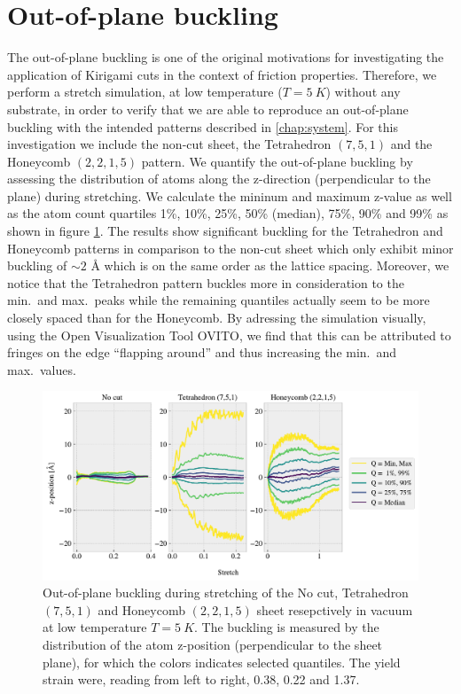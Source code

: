\section{Out-of-plane buckling}\label{sec:out-of-plane_buckling}
The out-of-plane buckling is one of the original motivations for investigating
the application of Kirigami cuts in the context of friction properties. Therefore, we perform a stretch simulation, at low temperature ($T = \SI{5}{K}$) without any substrate, in order to verify that we are able to reproduce an out-of-plane buckling with the
intended patterns described in \cref{chap:system}. For this investigation we include the non-cut sheet, the Tetrahedron $(7,5,1)$ and the Honeycomb $(2,2,1,5)$ pattern. We quantify the out-of-plane buckling by assessing the distribution of atoms along the z-direction (perpendicular to the plane) during stretching. We calculate the
mininum and maximum z-value as well as the atom count quartiles 1\%, 10\%, 25\%, 50\%
(median), 75\%, 90\% and 99\% as shown in figure \cref{fig:buckling_quartiles}. The results show significant buckling for the Tetrahedron and Honeycomb patterns in comparison to the non-cut sheet which only exhibit minor
buckling of $\sim 2$ Å which is on the same order as the lattice spacing.
Moreover, we notice that the Tetrahedron pattern buckles more in consideration
to the min.\ and max.\ peaks while the remaining quantiles actually seem to be more closely spaced than for the Honeycomb. By adressing the simulation visually, using the Open Visualization Tool OVITO, we find that this can be
attributed to fringes on the edge ``flapping around'' and thus increasing the
min.\ and max.\ values.

\begin{figure}[H]
  \centering
  \includegraphics[width=\linewidth]{figures/baseline/vacuum_normal_buckling.pdf}
  \caption{Out-of-plane buckling during stretching of the No cut, Tetrahedron $(7,5,1)$ and Honeycomb $(2,2,1,5)$ sheet resepctively in vacuum at low temperature $T = \SI{5}{K}$. The buckling is measured by the distribution of the atom z-position (perpendicular to the sheet plane), for which the colors indicates selected quantiles. The yield strain were, reading from left to right, 0.38, 0.22 and 1.37.}
  \label{fig:buckling_quartiles}
\end{figure}

